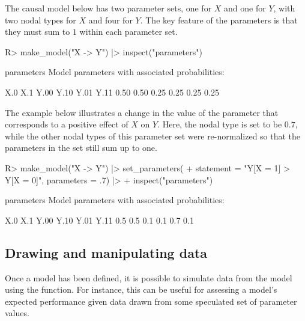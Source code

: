 \documentclass[
  11pt,
  article]{jss}
\renewcommand{\texttt}[1]{\code{#1}}
\begin{document}
The causal model below has two parameter sets, one for \(X\) and one for
\(Y\), with two nodal types for \(X\) and four for \(Y\). The key
feature of the parameters is that they must sum to \(1\) within each
parameter set.

\begin{CodeChunk}
\begin{CodeInput}
R> make_model("X -> Y") |> inspect("parameters")
\end{CodeInput}

\begin{CodeOutput}

parameters
Model parameters with associated probabilities:

 X.0  X.1 Y.00 Y.10 Y.01 Y.11
0.50 0.50 0.25 0.25 0.25 0.25
\end{CodeOutput}
\end{CodeChunk}

The example below illustrates a change in the value of the parameter
that corresponds to a positive effect of \(X\) on \(Y\). Here, the nodal
type \texttt{Y.Y01} is set to be \(0.7\), while the other nodal types of
this parameter set were re-normalized so that the parameters in the set
still sum up to one.

\begin{CodeChunk}
\begin{CodeInput}
R> make_model("X -> Y") |> set_parameters(
+    statement = "Y[X = 1] > Y[X = 0]", parameters = .7) |>
+    inspect("parameters")
\end{CodeInput}

\begin{CodeOutput}

parameters
Model parameters with associated probabilities:

 X.0  X.1 Y.00 Y.10 Y.01 Y.11
 0.5  0.5  0.1  0.1  0.7  0.1
\end{CodeOutput}
\end{CodeChunk}

\subsection{Drawing and manipulating
data}\label{drawing-and-manipulating-data}

Once a model has been defined, it is possible to simulate data from the
model using the \texttt{make\_data()} function. For instance, this can
be useful for assessing a model's expected performance given data drawn
from some speculated set of parameter values.
\end{document}

